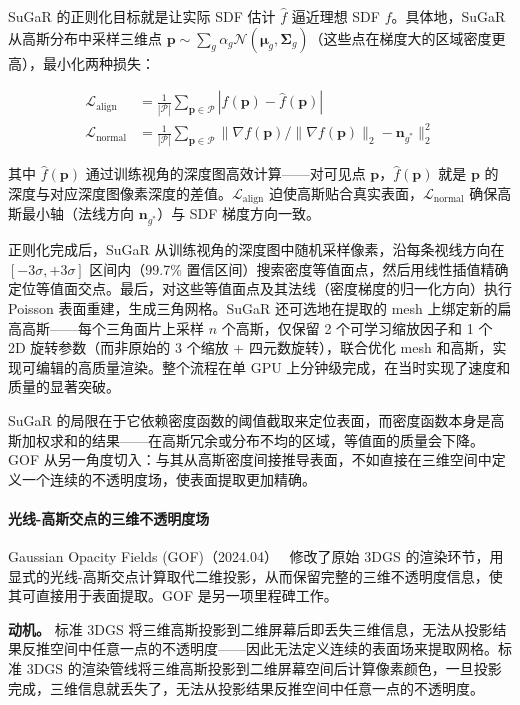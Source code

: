 SuGaR 的正则化目标就是让实际 SDF 估计 $\hat{f}$ 逼近理想 SDF $f$。具体地，SuGaR 从高斯分布中采样三维点 $\mathbf{p} \sim \sum_g \alpha_g \mathcal{N}(\boldsymbol{\mu}_g, \boldsymbol{\Sigma}_g)$（这些点在梯度大的区域密度更高），最小化两种损失：

\begin{align}
\mathcal{L}_{\text{align}} &= \frac{1}{|\mathcal{P}|} \sum_{\mathbf{p} \in \mathcal{P}} |f(\mathbf{p}) - \hat{f}(\mathbf{p})| \\
\mathcal{L}_{\text{normal}} &= \frac{1}{|\mathcal{P}|} \sum_{\mathbf{p} \in \mathcal{P}} \bigl\|\nabla f(\mathbf{p}) / \|\nabla f(\mathbf{p})\|_2 - \mathbf{n}_{g^*}\bigr\|_2^2
\end{align}

其中 $\hat{f}(\mathbf{p})$ 通过训练视角的深度图高效计算——对可见点 $\mathbf{p}$，$\hat{f}(\mathbf{p})$ 就是 $\mathbf{p}$ 的深度与对应深度图像素深度的差值。$\mathcal{L}_{\text{align}}$ 迫使高斯贴合真实表面，$\mathcal{L}_{\text{normal}}$ 确保高斯最小轴（法线方向 $\mathbf{n}_{g^*}$）与 SDF 梯度方向一致。

正则化完成后，SuGaR 从训练视角的深度图中随机采样像素，沿每条视线方向在 $[-3\sigma, +3\sigma]$ 区间内（99.7\% 置信区间）搜索密度等值面点，然后用线性插值精确定位等值面交点。最后，对这些等值面点及其法线（密度梯度的归一化方向）执行 Poisson 表面重建，生成三角网格。SuGaR 还可选地在提取的 mesh 上绑定新的扁高高斯——每个三角面片上采样 $n$ 个高斯，仅保留 2 个可学习缩放因子和 1 个 2D 旋转参数（而非原始的 3 个缩放 + 四元数旋转），联合优化 mesh 和高斯，实现可编辑的高质量渲染。整个流程在单 GPU 上分钟级完成，在当时实现了速度和质量的显著突破。

SuGaR 的局限在于它依赖密度函数的阈值截取来定位表面，而密度函数本身是高斯加权求和的结果——在高斯冗余或分布不均的区域，等值面的质量会下降。GOF 从另一角度切入：与其从高斯密度间接推导表面，不如直接在三维空间中定义一个连续的不透明度场，使表面提取更加精确。

\paragraph{光线-高斯交点的三维不透明度场}

Gaussian Opacity Fields (GOF)（2024.04）~\cite{2404_10772} 修改了原始 3DGS 的渲染环节，用显式的光线-高斯交点计算取代二维投影，从而保留完整的三维不透明度信息，使其可直接用于表面提取。GOF 是另一项里程碑工作。

\textbf{动机。} 标准 3DGS 将三维高斯投影到二维屏幕后即丢失三维信息，无法从投影结果反推空间中任意一点的不透明度——因此无法定义连续的表面场来提取网格。标准 3DGS 的渲染管线将三维高斯投影到二维屏幕空间后计算像素颜色，一旦投影完成，三维信息就丢失了，无法从投影结果反推空间中任意一点的不透明度。

